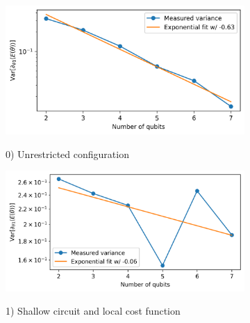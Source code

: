 \begin{figure}
    \centering
    \begin{subfigure}[b]{.49\linewidth}
        \includegraphics[width=\linewidth]{Artefact/Appendices/var0.png}
        \centerline{0) Unrestricted configuration}
    \end{subfigure}
    \hfill
    \begin{subfigure}[b]{.49\linewidth}
        \includegraphics[width=\linewidth]{Artefact/Appendices/var1.png}
        \centerline{1) Shallow circuit and local cost function}
    \end{subfigure}


\end{figure}

